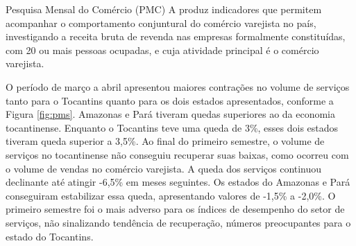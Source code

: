 \begin{smbox}[label={labelbox},nameref={Pesquisa Mensal do Comércio(PMC)}]{Pesquisa Mensal do Comércio (PMC)}
A  produz indicadores que permitem acompanhar o comportamento conjuntural do comércio varejista no país, investigando a receita bruta de revenda nas empresas formalmente constituídas, com 20 ou mais pessoas ocupadas, e cuja atividade principal é o comércio varejista.
\end{smbox}

\par O período de março a abril apresentou maiores contrações no volume de serviços tanto para o Tocantins quanto para os dois estados apresentados, conforme a Figura \ref{fig:pms}. Amazonas e Pará tiveram quedas superiores ao da economia tocantinense. Enquanto o Tocantins teve uma queda de 3\%, esses dois estados tiveram queda superior a 3,5\%. Ao final do primeiro semestre, o volume de serviços no tocantinense não conseguiu recuperar suas baixas, como ocorreu com o volume de vendas no comércio varejista. A queda dos serviços continuou declinante até atingir -6,5\% em meses seguintes. Os estados do Amazonas e Pará conseguiram estabilizar essa queda, apresentando valores de -1,5\% a -2,0\%. O primeiro semestre foi o mais adverso para os índices de desempenho do setor de serviços, não sinalizando tendência de recuperação, números preocupantes para o estado do Tocantins.


